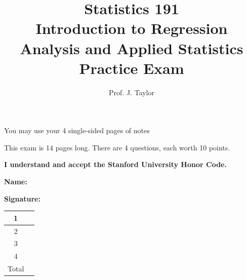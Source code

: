 \documentclass{article}
\begin{document}
\title{Statistics 191 \\ Introduction to Regression Analysis and Applied Statistics \\ Practice Exam }
\author{Prof. J.  Taylor}
\date{}
\maketitle 

{\sc You may use your 4 single-sided pages of notes}

{\sc This exam is 14 pages long. There are 4 questions, each worth 10 points.}

\vspace{1in}


{\bf \sc I understand and accept the Stanford University Honor Code.}

\vspace{0.5in}

{\bf \sc Name:} \underline{\hspace{2.5in}}

\vspace{0.5in}

{\bf \sc Signature:} \underline{\hspace{2.5in}}

\vspace{1in}
\begin{center}
\begin{tabular}{|c|p{0.8in}|} \hline
  1 & \\ \hline
  2 & \\ \hline
  3 & \\ \hline
  4 & \\ \hline
  Total & \\ \hline
\end{tabular}
  
\end{center}

\newpage
\end{document}
